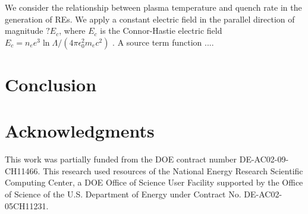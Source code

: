 \documentclass[12pt]{siamart}
\begin{document}
We consider the relationship between plasma temperature and quench rate in the generation of REs.
We apply a constant electric field in the parallel direction of magnitude $? E_c$, where $E_c$ is the Connor-Hastie electric field $E_c =n_e e^3\ln \Lambda / \left (4 \pi \epsilon_0^2 m_e c^2\right)$ \cite{Connor1975}.
A source term function ....

\section{Conclusion}

\section{Acknowledgments}

 This work was partially funded from the DOE contract number
DE-AC02-09-CH11466.  This research used resources of the National
Energy Research Scientific Computing Center, a DOE Office of Science
User Facility supported by the Office of Science of the
U.S. Department of Energy under Contract No. DE-AC02-05CH11231.



\end{document}
